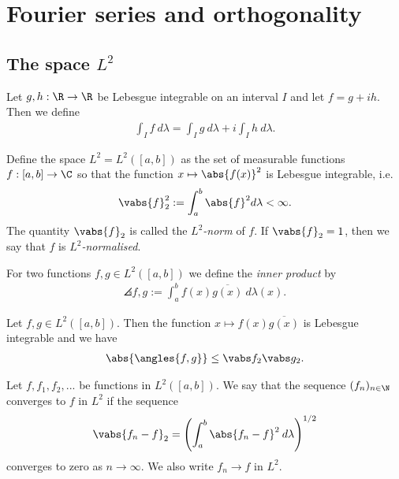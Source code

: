 \documentclass{article}
\begin{document}
\section{Fourier series and orthogonality}

\subsection{The space $L^2$}

\begin{definition}
	Let $g,h:\R\to\R$ be Lebesgue integrable on an interval $I$ and let $f=g+ih$. Then we
	define
	\begin{align*}
		\int_I	f\:d\lambda = \int_I g\:d\lambda + i\int_I h\:d\lambda.
	\end{align*}
\end{definition}

\begin{definition}
	Define the space $L^2=L^2([a,b])$ as the set of measurable functions $f:[a,b]\to\C$
	so that the function $x\mapsto \abs{f(x)}^2$ is Lebesgue integrable, i.e.
	\begin{align*}
		\vabs{f}_2^2 := \int_a^b \abs{f}^2 d\lambda < \infty.
	\end{align*}
	The quantity $\vabs{f}_2$ is called the \emph{$L^2$-norm} of $f$. If $\vabs{f}_2=1$,
	then we say that $f$ is \emph{$L^2$-normalised}.
\end{definition}

\begin{definition}
	For two functions $f,g\in L^2([a,b])$ we define the \emph{inner product} by
	\begin{align*}
		\angles{f,g} := \int_a^b f(x)\overline{g(x)}\:d\lambda(x).
	\end{align*}
\end{definition}

\begin{theorem}
	Let $f,g\in L^2([a,b])$. Then the function $x\mapsto f(x)\overline{g(x)}$ is Lebesgue
	integrable and we have
	\begin{align*}
		\abs{\angles{f,g}}\leq \vabs f_2\vabs g_2.
	\end{align*}
\end{theorem}

\begin{definition}
	Let $f,f_1,f_2,...$ be functions in $L^2([a,b])$. We say that the sequence $(f_n)_{n\in\N}$ converges
	to $f$ in $L^2$ if the sequence
	\begin{align*}
		\vabs{f_n - f}_2 = \left(\int_a^b \abs{f_n-f}^2\:d\lambda\right)^{1/2}
	\end{align*}
	converges to zero as $n\to\infty$. We also write $f_n\to f$ in $L^2$.
\end{definition}
\end{document}
